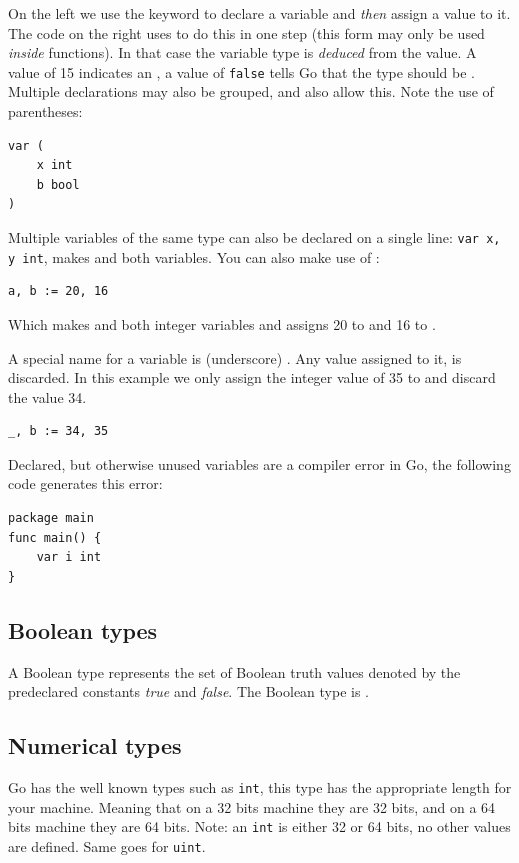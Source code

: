 On the left we use the
 keyword to declare a variable and \emph{then} assign a value to
it. The code on the right uses \mbox{\key{:=}{ }} to do this in one
step (this form may only be used \emph{inside} functions).
In that case the variable
type is \emph{deduced} from the value. A value of 15 indicates an ,
a value of \texttt{false} tells Go that the type should be . 
Multiple  declarations may also be grouped, 
and  also allow this. Note the use of parentheses:
\begin{lstlisting}
var (
    x int
    b bool
)
\end{lstlisting}
Multiple variables of the same type can also be declared on a
single line: \lstinline{var x, y int}, makes  and  both
 variables. You can also make use of :
\begin{lstlisting}
a, b := 20, 16
\end{lstlisting}
Which makes  and  both integer variables and assigns
20 to  and 16 to .

A special name for a variable is \var{\textbf{\_}} 
(underscore) . Any value
assigned to it, is discarded. In this example we only assign the integer
value of 35 to  and discard the value 34.
\begin{lstlisting}
_, b := 34, 35
\end{lstlisting}
Declared, but otherwise unused variables are a compiler error in Go, the
following code generates this error:

\begin{lstlisting}
package main
func main() { 
    var i int
}
\end{lstlisting}

\subsection{Boolean types}
A Boolean type represents the set of Boolean truth values denoted by the
predeclared constants \emph{true} and \emph{false}. The Boolean type is .

\subsection{Numerical types}
Go has the well known types such as \lstinline{int}, this type
has the appropriate length for your machine. 
Meaning that on a 32 bits machine they are 32 bits, and on
a 64 bits machine they are 64 bits. Note: an \lstinline{int} is
either 32 or 64 bits, no other values are defined. Same goes 
for \lstinline{uint}.

